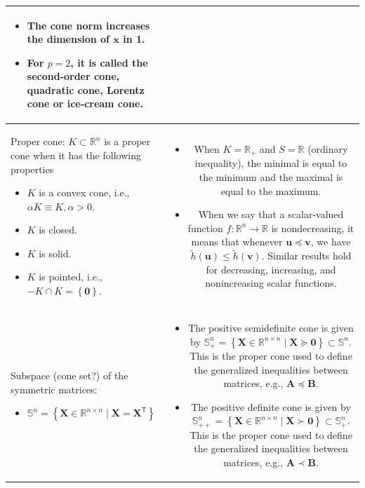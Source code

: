 \documentclass{article}
\begin{document}
\begin{table}[H]
\begin{tabularx}{\textwidth}{|A|C|}
\begin{itemize}[leftmargin=*]
    \item The cone norm increases the dimension of \(\mathbf{x}\) in 1.
    \item For \(p=2\), it is called the second-order cone, quadratic cone,  Lorentz cone or ice-cream cone.
\end{itemize} \\
\hline
Proper cone: \(K \subset \mathbb{R}^{n}\) is a proper cone when it has the following properties
\begin{itemize}
    \item \(K\) is a convex cone, i.e., \(\alpha K \equiv K, \alpha > 0\).
    \item \(K\) is closed.
    \item \(K\) is solid.
    \item \(K\) is pointed, i.e., \(-K \cap K = \left\{ \mathbf{0} \right\}\).
\end{itemize} & \vspace{-3.5ex} \begin{itemize}[leftmargin=*]
    \item When \(K = \mathbb{R}_{+}\) and \(S = \mathbb{R}\) (ordinary inequality), the minimal is equal to the minimum and the maximal is equal to the maximum.
    \item When we say that a scalar-valued function \(f: \mathbb{R}^{n} \rightarrow \mathbb{R}\) is nondecreasing, it means that whenever \(\mathbf{u}\preceq \mathbf{v}\), we have \(\tilde{h}(\mathbf{u})\leq \tilde{h}(\mathbf{v})\). Similar results hold for decreasing, increasing, and nonincreasing scalar functions.
\end{itemize} \\
\hline
Subspace (cone set?) of the symmetric matrices:
\begin{itemize}
    \item \(\mathbb{S}^n = \left\{ \mathbf{X} \in \mathbb{R}^{n\times n} \mid \mathbf{X} = \mathbf{X}^\mathsf{T}\right\}\)
\end{itemize} & \vspace{-3.5ex} \begin{itemize}[leftmargin=*]
    \item The positive semidefinite cone is given by \(\mathbb{S}^n_+ = \left\{ \mathbf{X} \in \mathbb{R}^{n\times n} \mid \mathbf{X} \succeq \mathbf{0} \right\} \subset \mathbb{S}^n\). This is the proper cone used to define the generalized inequalities between matrices, e.g., \(\mathbf{A} \preceq \mathbf{B}\).
    \item The positive definite cone is given by \(\mathbb{S}^n_{++} = \left\{ \mathbf{X} \in \mathbb{R}^{n\times n} \mid \mathbf{X} \succ \mathbf{0} \right\}\subset \mathbb{S}^n_+ \). This is the proper cone used to define the generalized inequalities between matrices, e.g., \(\mathbf{A} \prec \mathbf{B}\).

\end{itemize}
\end{tabularx}
\end{table}
\end{document}
